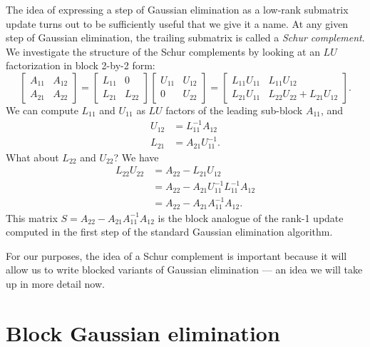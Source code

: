 \documentclass[12pt, leqno]{article}
\begin{document}
The idea of expressing a step of Gaussian elimination as a low-rank
submatrix update turns out to be sufficiently useful that we give it
a name.  At any given step of Gaussian elimination, the trailing
submatrix is called a {\em Schur complement}.  We investigate the
structure of the Schur complements by looking at an $LU$
factorization in block 2-by-2 form:
\[
  \begin{bmatrix}
    A_{11} & A_{12} \\
    A_{21} & A_{22}
  \end{bmatrix} =
  \begin{bmatrix}
    L_{11} & 0 \\
    L_{21} & L_{22}
  \end{bmatrix}
  \begin{bmatrix}
    U_{11} & U_{12} \\
        0 & U_{22}
  \end{bmatrix} =
  \begin{bmatrix}
    L_{11} U_{11} & L_{11} U_{12} \\
    L_{21} U_{11} & L_{22} U_{22} + L_{21} U_{12}
  \end{bmatrix}.
\]
We can compute $L_{11}$ and $U_{11}$ as $LU$ factors of the leading
sub-block $A_{11}$, and
\begin{align*}
  U_{12} &= L_{11}^{-1} A_{12} \\
  L_{21} &= A_{21} U_{11}^{-1}.
\end{align*}
What about $L_{22}$ and $U_{22}$?  We have
\begin{align*}
  L_{22} U_{22}
  &= A_{22} - L_{21} U_{12} \\
  &= A_{22} - A_{21} U_{11}^{-1} L_{11}^{-1} A_{12} \\
  &= A_{22} - A_{21} A_{11}^{-1} A_{12}.
\end{align*}
This matrix $S = A_{22} - A_{21} A_{11}^{-1} A_{12}$ is the block analogue
of the rank-1 update computed in the first step of the standard
Gaussian elimination algorithm.

For our purposes, the idea of a Schur complement is important because
it will allow us to write blocked variants of Gaussian elimination ---
an idea we will take up in more detail now.


\section{Block Gaussian elimination}
\end{document}
